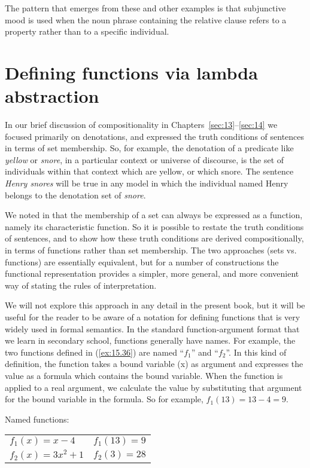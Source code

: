 The pattern that emerges from these and other examples is that subjunctive mood is used when the noun phrase containing the relative clause refers to a property rather than to a specific individual.


\section{Defining functions via lambda abstraction}\label{sec:15.6}

In our brief discussion of compositionality in Chapters~\ref{sec:13}--\ref{sec:14} we focused primarily on denotations, and expressed the truth conditions of sentences in terms of set membership. So, for example, the denotation of a predicate like \textit{yellow} or \textit{snore}, in a particular context or universe of discourse, is the set of individuals within that context which are yellow, or which snore. The sentence \textit{Henry snores} will be true in any model in which the individual named Henry belongs to the denotation set of \textit{snore}.



We noted in  that the membership of a set can always be expressed as a function, namely its characteristic function. So it is possible to restate the truth conditions of sentences, and to show how these truth conditions are derived compositionally, in terms of functions rather than set membership. The two approaches (sets vs. functions) are essentially equivalent, but for a number of constructions the functional representation provides a simpler, more general, and more convenient way of stating the rules of interpretation.



We will not explore this approach in any detail in the present book, but it will be useful for the reader to be aware of a notation for defining functions that is very widely used in formal semantics. In the standard function-argument format that we learn in secondary school, functions generally have names. For example, the two functions defined in (\ref{ex:15.36}) are named “$f_1$” and “$f_2$”. In this kind of definition, the function takes a bound variable (x) as argument and expresses the value as a formula which contains the bound variable. When the function is applied to a real argument, we calculate the value by substituting that argument for the bound variable in the formula. So for example, $f_1 (13) = 13 - 4 = 9$.


\ea \label{ex:15.36}
Named functions:\\
\begin{tabular}{ll}
$f_1(x) = x - 4$  & $f_1(13) = 9$\\
$f_2(x) = 3x^2 + 1 $ & $f_2(3) = 28$
\end{tabular}
\z



